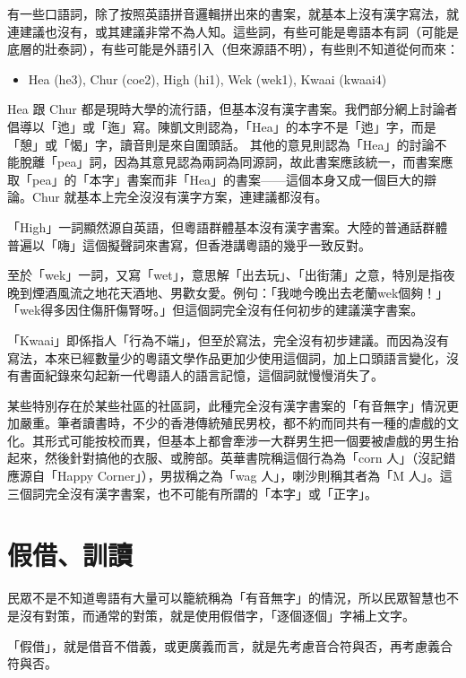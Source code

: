 \documentclass[a5paper, 12pt, openany]{book} %
\begin{document}
有一些口語詞，除了按照英語拼音邏輯拼出來的書案，就基本上沒有漢字寫法，就連建議也沒有，或其建議非常不為人知。這些詞，有些可能是粵語本有詞（可能是底層的壯泰詞），有些可能是外語引入（但來源語不明），有些則不知道從何而來：

\begin{itemize}
\item Hea  (he3), Chur (coe2), High (hi1), Wek (wek1), Kwaai (kwaai4)
\end{itemize}

Hea 跟 Chur 都是現時大學的流行語，但基本沒有漢字書案。我們部分網上討論者倡導以「迆」或「迤」寫。陳凱文則認為，「Hea」的本字不是「迆」字，而是「憩」或「愒」字，讀音則是來自圍頭話。  其他的意見則認為「Hea」的討論不能脫離「pea」詞，因為其意見認為兩詞為同源詞，故此書案應該統一，而書案應取「pea」的「本字」書案而非「Hea」的書案——這個本身又成一個巨大的辯論。Chur 就基本上完全沒沒有漢字方案，連建議都沒有。

「High」一詞顯然源自英語，但粵語群體基本沒有漢字書案。大陸的普通話群體普遍以「嗨」這個擬聲詞來書寫，但香港講粵語的幾乎一致反對。

至於「wek」一詞，又寫「wet」，意思解「出去玩」、「出街蒲」之意，特別是指夜晚到煙酒風流之地花天酒地、男歡女愛。例句：「我哋今晚出去老蘭wek個夠！」「wek得多因住傷肝傷腎呀。」但這個詞完全沒有任何初步的建議漢字書案。

「Kwaai」即係指人「行為不端」，但至於寫法，完全沒有初步建議。而因為沒有寫法，本來已經數量少的粵語文學作品更加少使用這個詞，加上口頭語言變化，沒有書面紀錄來勾起新一代粵語人的語言記憶，這個詞就慢慢消失了。

某些特別存在於某些社區的社區詞，此種完全沒有漢字書案的「有音無字」情況更加嚴重。筆者讀書時，不少的香港傳統殖民男校，都不約而同共有一種的虐戲的文化。其形式可能按校而異，但基本上都會牽涉一大群男生把一個要被虐戲的男生抬起來，然後針對搞他的衣服、或胯部。英華書院稱這個行為為「corn 人」（沒記錯應源自「Happy Corner」），男拔稱之為「wag 人」，喇沙則稱其者為「M 人」。這三個詞完全沒有漢字書案，也不可能有所謂的「本字」或「正字」。

\section{假借、訓讀}

民眾不是不知道粵語有大量可以籠統稱為「有音無字」的情況，所以民眾智慧也不是沒有對策，而通常的對策，就是使用假借字，「逐個逐個」字補上文字。

「假借」，就是借音不借義，或更廣義而言，就是先考慮音合符與否，再考慮義合符與否。
\end{document}
